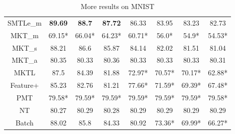 \begin{table*}[htbp]
{{\begin{tabular}{|c|c|c|c|c|c|c|c|}
      SMTLe\_m & \textbf{89.69} & \textbf{88.7} & \textbf{87.72} & 86.33 & 83.95 & 83.23 & 82.73\\ 
      MKT\_{m} & 69.15* & 66.04* & 64.23* & 60.71* & 56.0* & 54.9* & 54.53*\\ 
      MKT\_{s} & 88.21 & 86.6 & 85.87 & 84.14 & 82.02 & 81.51 & 81.04\\ 
      MKT\_{a} & 80.35 & 80.33 & 80.36 & 80.33 & 80.33 & 80.33 & 80.31\\ 
      MKTL & 87.5 & 84.39 & 81.88 & 72.97* & 70.57* & 70.17* & 62.88*\\ 
      Feature+ & 85.23 & 82.76 & 81.21 & 77.66* & 71.59* & 69.39* & 67.48*\\ 
      PMT & 79.58* & 79.59* & 79.59* & 79.59* & 79.59* & 79.59* & 79.58*\\ 
      NT & 80.27 & 80.29 & 80.28 & 80.29 & 80.29 & 80.29 & 80.29\\ 
      Batch & 88.02 & 85.8 & 84.33 & 80.92 & 73.36* & 69.99* & 66.27*\\ 
\hline\end{tabular}}}\caption{More results on MNIST}\label{tab:mnist}
\end{table*}



